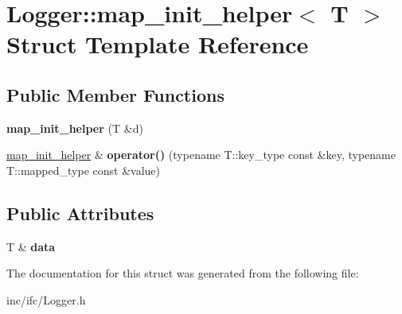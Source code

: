 \hypertarget{structLogger_1_1map__init__helper}{}\section{Logger\+:\+:map\+\_\+init\+\_\+helper$<$ T $>$ Struct Template Reference}
\label{structLogger_1_1map__init__helper}
\subsection*{Public Member Functions}
\begin{DoxyCompactItemize}
\item 
\mbox{\label{structLogger_1_1map__init__helper_a64b7b9158fe41bd43498bf2b2707d612}} 
{\bfseries map\+\_\+init\+\_\+helper} (T \&d)
\item 
\mbox{\label{structLogger_1_1map__init__helper_aa48a30eac8bebde37fff11b69426b27a}} 
\hyperlink{structLogger_1_1map__init__helper}{map\+\_\+init\+\_\+helper} \& {\bfseries operator()} (typename T\+::key\+\_\+type const \&key, typename T\+::mapped\+\_\+type const \&value)
\end{DoxyCompactItemize}
\subsection*{Public Attributes}
\begin{DoxyCompactItemize}
\item 
\mbox{\label{structLogger_1_1map__init__helper_afa0d45b9ba41fd2e55e4eb8aa3c9377e}} 
T \& {\bfseries data}
\end{DoxyCompactItemize}


The documentation for this struct was generated from the following file\+:\begin{DoxyCompactItemize}
\item 
inc/ifc/Logger.\+h\end{DoxyCompactItemize}
